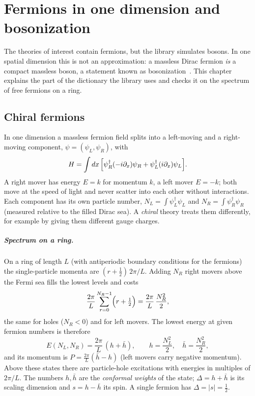 \chapter{Fermions in one dimension and bosonization}\label{chap:bosonization}

The theories of interest contain fermions, but the library simulates bosons. In one spatial dimension this is
not an approximation: a massless Dirac fermion \emph{is} a compact massless boson, a statement known as
bosonization~\cite{Coleman1975,Mandelstam1975,Giamarchi2003}. This chapter explains the part of the dictionary
the library uses and checks it on the spectrum of free fermions on a ring.

\section{Chiral fermions}
In one dimension a massless fermion field splits into a left-moving and a right-moving component,
$\psi = (\psi_L, \psi_R)$, with
\begin{equation}
  H = \int dx\,\Bigl[\psi_R^\dagger(-i\partial_x)\psi_R + \psi_L^\dagger(i\partial_x)\psi_L\Bigr].
\end{equation}
A right mover has energy $E = k$ for momentum $k$, a left mover $E = -k$; both move at the speed of light and
never scatter into each other without interactions. Each component has its own particle number,
$N_L = \int\psi_L^\dagger\psi_L$ and $N_R = \int\psi_R^\dagger\psi_R$ (measured relative to the filled Dirac sea).
A \emph{chiral} theory treats them differently, for example by giving them different gauge charges.

\paragraph{Spectrum on a ring.} On a ring of length $L$ (with antiperiodic boundary conditions for the fermions)
the single-particle momenta are $(r+\frac12)\,2\pi/L$. Adding $N_R$ right movers above the Fermi sea fills the
lowest levels and costs
\begin{equation}
  \frac{2\pi}{L}\sum_{r=0}^{N_R-1}\Bigl(r+\tfrac12\Bigr) = \frac{2\pi}{L}\,\frac{N_R^2}{2},
\end{equation}
the same for holes ($N_R<0$) and for left movers. The lowest energy at given fermion numbers is therefore
\begin{equation}\label{eq:fermion-sector}
  E(N_L, N_R) = \frac{2\pi}{L}\,(h + \bar h),\qquad h = \frac{N_L^2}{2},\quad \bar h = \frac{N_R^2}{2},
\end{equation}
and its momentum is $P = \frac{2\pi}{L}(\bar h - h)$ (left movers carry negative momentum). Above these states
there are particle-hole excitations with energies in multiples of $2\pi/L$. The numbers $h,\bar h$ are the
\emph{conformal weights} of the state; $\Delta = h + \bar h$ is its scaling dimension and $s = h - \bar h$ its
spin. A single fermion has $\Delta = |s| = \frac12$.

